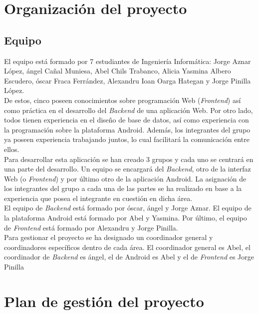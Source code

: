 \documentclass[12pt]{article}%
\begin{document}

\section{Organizaci\'on del proyecto} %
\subsection{Equipo}

El equipo est\'a formado por 7 estudiantes de Ingenier\'ia Inform\'atica: Jorge Aznar L\'opez, \'angel Ca\~nal Muniesa, Abel Chils Trabanco, Alicia Yasmina Albero Escudero, \'oscar Fraca Ferr\'andez, Alexandru Ioan Oarga Hategan y Jorge Pinilla L\'opez.\\

De estos, cinco poseen conocimientos sobre programaci\'on Web (\textit{Frontend}) as\'i como pr\'actica en el desarrollo del \textit{Backend} de una aplicaci\'on Web. Por otro lado, todos tienen experiencia en el dise\~no de base de datos, as\'i como experiencia con la programaci\'on sobre la plataforma Android. Adem\'as, los integrantes del grupo ya poseen experiencia trabajando juntos, lo cual facilitar\'a la comunicaci\'on entre ellos. \\

Para desarrollar esta aplicaci\'on se han creado 3 grupos y cada uno se centrar\'a en una parte del desarrollo. Un equipo se encargar\'a del
\textit{Backend}, otro de la interfaz Web (o \textit{Frontend}) y por \'ultimo otro de la aplicaci\'on Android. La asignaci\'on de los integrantes del grupo a cada una de las partes se ha realizado en base a la experiencia que posea el integrante en cuesti\'on en dicha \'area.\\

El equipo de \textit{Backend} est\'a formado por \'oscar, \'angel y Jorge Aznar. El equipo de la plataforma Android est\'a formado por Abel y Yasmina. Por \'ultimo, el equipo de \textit{Frontend} est\'a formado por Alexandru y Jorge Pinilla. \\

Para gestionar el proyecto se ha designado un coordinador general y coordinadores espec\'ificos dentro de cada \'area. El coordinador general es Abel, el coordinador de \textit{Backend} es \'angel, el de Android es Abel y el de \textit{Frontend} es Jorge Pinilla


\section{Plan de gesti\'on del proyecto} %
\end{document}
